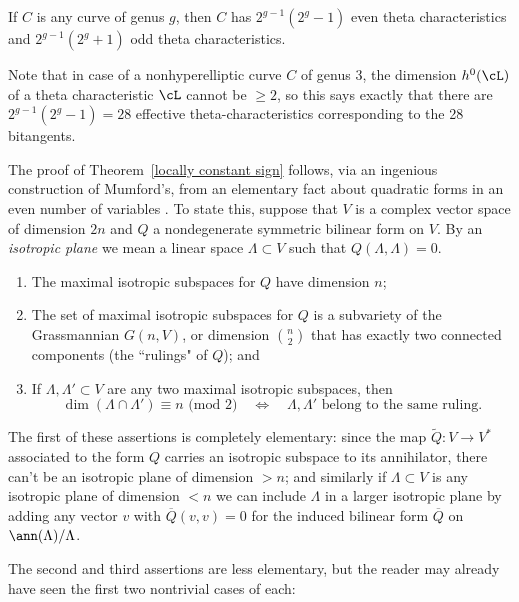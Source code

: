 \begin{theorem}\label{number of theta characteristics}
If $C$ is any curve of genus $g$, then $C$ has $2^{g-1}(2^g - 1)$ even theta characteristics and $2^{g-1}(2^g+1)$ odd theta characteristics.
\end{theorem}

Note that in case of a nonhyperelliptic curve $C$ of genus 3, the dimension $h^0(\cL)$ of a theta characteristic $\cL$ cannot be $\geq 2$, so this says exactly that there are $2^{g-1}(2^g-1) = 28$ effective theta-characteristics corresponding to the 28 bitangents.

The proof of Theorem~\ref{locally constant sign} follows, via an ingenious construction of Mumford's, from an elementary fact about quadratic forms in an even number of variables . To state this, suppose that $V$ is a complex vector space of dimension $2n$ and $Q$ a nondegenerate symmetric bilinear form on $V$. By an \emph{isotropic plane} we mean a linear space $\Lambda \subset V$ such that $Q(\Lambda, \Lambda) = 0$. 

\begin{fact}
 \begin{enumerate}
\item The maximal isotropic subspaces for $Q$ have dimension $n$;
\item The set of maximal isotropic subspaces for $Q$ is a subvariety of the Grassmannian $G(n,V)$, or dimension $\binom{n}{2}$ that has exactly two connected components (the ``rulings" of $Q$); and
\item If $\Lambda, \Lambda' \subset V$ are any two maximal isotropic subspaces, then
$$
\dim(\Lambda \cap \Lambda') \equiv n \text{ (mod 2)} \quad \iff \quad \Lambda, \Lambda' \text{ belong to the same ruling.}
$$
\end{enumerate} 
\end{fact}

The first of these assertions is completely elementary: since the map $\tilde Q : V \to V^*$ associated to the form $Q$ carries an isotropic subspace to its annihilator, there can't be an isotropic plane of dimension $>n$; and similarly if $\Lambda \subset V$ is any isotropic plane of dimension $<n$ we can include $\Lambda$ in a larger isotropic plane by adding any vector $v$ with $\overline Q(v,v) = 0$ for the induced bilinear form $\overline Q$ on $\ann(\Lambda)/\Lambda$.

The second and third assertions are less elementary, but the reader may already have seen the first two nontrivial cases of each: 

